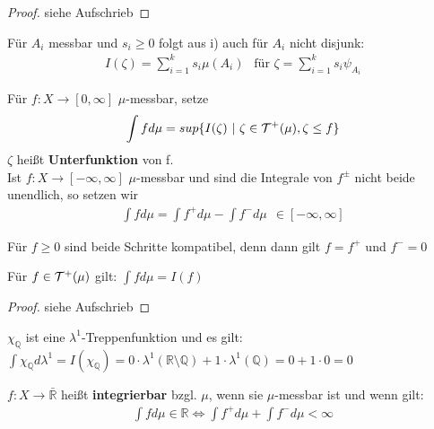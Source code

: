   \begin{proof}
    siehe Aufschrieb
  \end{proof}

  \begin{remark}
    Für $A_i$ messbar und $s_i \geq 0$ folgt aus i) auch für $A_i$ nicht disjunk:
    \begin{align*}
      I(\zeta) = \sum\limits_{i=1}^k s_i \mu(A_i) \ \ \text{ für } \zeta = \sum\limits_{i=1}^k s_i \psi_{A_i}
    \end{align*}
  \end{remark}

  \begin{definition}
    Für $f: X \to [0,\infty]$ $\mu$-messbar, setze
    \begin{align*}
      \int f d\mu = sup\{I(\zeta) \ | \ \zeta \in \mathcal{T}^+(\mu), \zeta \leq f\}
    \end{align*}
    $\zeta$ heißt \textbf{Unterfunktion} von f.\\
    Ist $f: X \to [-\infty, \infty]$ $\mu$-messbar und sind die Integrale von $f^{\pm}$ nicht beide unendlich, so setzen wir
    \begin{align*}
      \int f d\mu = \int f^+ d\mu - \int f^- d\mu \ \ \in [-\infty, \infty] 
    \end{align*}
  \end{definition}

  \begin{remark}
    Für $f \geq 0$ sind beide Schritte kompatibel, denn dann gilt $f = f^+$ und $f^- = 0$
  \end{remark}

  \begin{lemma}
    Für $f \in \mathcal{T}^+(\mu)$ gilt: $\int f d\mu = I(f)$
  \end{lemma}

  \begin{proof}
    siehe Aufschrieb
  \end{proof}

  \begin{example}
    $\chi_{\mathbb{Q}}$ ist eine $\lambda^1$-Treppenfunktion und es gilt:\\
    $\int \chi_{\mathbb{Q}} d\lambda^1 = I(\chi_{\mathbb{Q}}) = 0 \cdot \lambda^1(\mathbb{R} \setminus \mathbb{Q}) + 1 \cdot \lambda^1(\mathbb{Q}) = 0 + 1 \cdot 0 = 0$
  \end{example}

  \begin{definition}
    $f:X \to \bar{\mathbb{R}}$ heißt \textbf{integrierbar} bzgl. $\mu$, wenn sie $\mu$-messbar ist und wenn gilt:
    \begin{align*}
      \int f d\mu \in \mathbb{R} \Leftrightarrow \int f^+ d\mu + \int f^- d\mu < \infty
    \end{align*}
  \end{definition}

